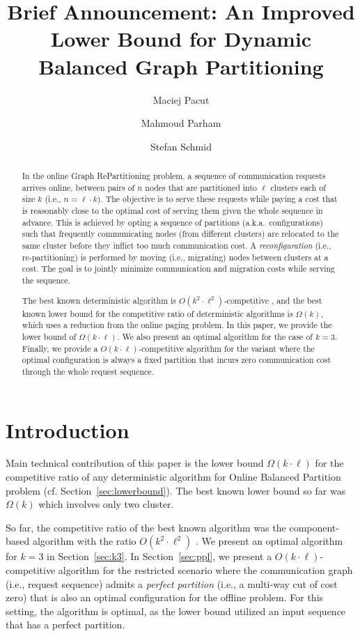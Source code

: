 \documentclass[manuscript,screen=true]{acmart}
\title{Brief Announcement: An Improved Lower Bound for Dynamic Balanced Graph Partitioning}
\author{Maciej Pacut}
\affiliation{%
  \institution{Faculty of Computer Science, University of Vienna}
  \country{Austria}
}
\author{Mahmoud Parham}
\affiliation{%
  \institution{Faculty of Computer Science, University of Vienna}
  \country{Austria}
}
\author{Stefan Schmid}
\affiliation{%
  \institution{Faculty of Computer Science, University of Vienna}
  \country{Austria}
}
\begin{document}
\begin{abstract}
  In the online Graph RePartitioning problem,
  a sequence of communication requests arrives online,
  between pairs of $n$ nodes that are partitioned into $\ell$ clusters
  each of size $k$ (i.e., $n = \ell \cdot k$).
  The objective is to serve these requests while paying a cost that is reasonably close to the optimal cost of serving them given  the whole sequence in advance. 
  This is achieved by opting a sequence of  partitions (a.k.a.~configurations)
  such that frequently communicating nodes (from different clusters)
  are relocated to the same cluster before they inflict too much communication cost.
  A \emph{reconfiguration} (i.e., re-partitioning) is performed by
  moving (i.e., migrating) nodes between clusters at a cost.
  The goal is to jointly minimize communication and migration costs while serving the sequence.

	The best known deterministic algorithm is $O(k^2\cdot \ell^2)$-competitive \cite{?????},
	and the best known lower bound for the competitive ratio of
	deterministic algorithms is $\Omega(k)$,
	which uses a reduction from the online paging problem.
	  In this paper, we provide the lower bound of $\Omega(k\cdot \ell)$.
    We also present an optimal algorithm for the case of $k=3$.
  Finally,
  we provide a $O(k\cdot \ell)$-competitive algorithm for the variant
  where the optimal configuration is always a fixed partition
  that incurs zero communication cost through the whole request sequence.
\end{abstract}
    
\maketitle
    
\renewcommand{\shortauthors}{M.~Pacut, M.~Parham, S.~Schmid}

\section{Introduction}

Main technical contribution of this paper is the lower bound $\Omega(k\cdot\ell)$ for the competitive ratio of any deterministic algorithm for Online Balanced Partition problem (cf. Section~\ref{sec:lowerbound}).
The best known lower bound so far was $\Omega(k)$ \cite{repartition-disc}
which involves only two cluster.


So far, the competitive ratio of the best known algorithm was the component-based algorithm with the ratio $O(k^2\cdot \ell^2)$ \cite{repartition-disc}.
We present an optimal algorithm for $k=3$ in Section~\ref{sec:k3}.
In Section~\ref{sec:ppl}, we present a $O(k\cdot \ell)$-competitive algorithm for the restricted scenario
where the communication graph (i.e., request sequence) admits a \emph{perfect partition} (i.e., a multi-way cut of cost zero) that is also an optimal configuration for the offline problem.
For this setting, the algorithm is optimal, as the lower bound utilized an input sequence that has a perfect partition.
\end{document}
